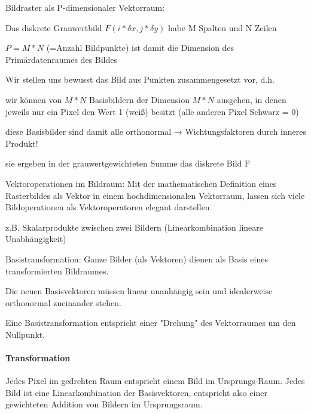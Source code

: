 \documentclass[landscape]{article}
\begin{document}
\begin{multicols}{3}
  Bildraster als P-dimensionaler Vektorraum:
  \begin{itemize*}
    \item Das diskrete Grauwertbild $F (i* \delta x, j * \delta y )$ habe M Spalten und N Zeilen
    \item $P = M * N$ (=Anzahl Bildpunkte) ist damit die Dimension des Primärdatenraumes des Bildes
    \item Wir stellen uns bewusst das Bild aus Punkten zusammengesetzt vor, d.h.
    \begin{itemize*}
      \item wir können von $M * N$ Basisbildern der Dimension $M * N$ ausgehen, in denen jeweils nur ein Pixel den Wert 1 (weiß) besitzt (alle anderen Pixel Schwarz = 0)
      \item diese Basisbilder sind damit alle orthonormal → Wichtungsfaktoren durch inneres Produkt!
      \item sie ergeben in der grauwertgewichteten Summe das diskrete Bild F
    \end{itemize*}
  \end{itemize*}
  
  
  Vektoroperationen im Bildraum: Mit der mathematischen Definition eines Rasterbildes als Vektor in einem hochdimensionalen Vektorraum, lassen sich viele Bildoperationen als Vektoroperatoren elegant darstellen
  \begin{itemize*}
    \item z.B. Skalarprodukte zwischen zwei Bildern (Linearkombination lineare Unabhängigkeit)
    \item Basistransformation: Ganze Bilder (als Vektoren) dienen als Basis eines transformierten Bildraumes.
    \item Die neuen Basisvektoren müssen linear unanhängig sein und idealerweise orthonormal zueinander stehen.
    \item Eine Basistransformation entspricht einer "Drehung" des Vektorraumes um den Nullpunkt.
  \end{itemize*}
  
  \paragraph{Transformation}
  Jedes Pixel im gedrehten Raum entspricht einem Bild im Ursprungs-Raum.
  Jedes Bild ist eine Linearkombination der Basisvektoren, entspricht also einer gewichteten Addition von Bildern im Ursprungsraum.
  

\end{multicols}
\end{document}
